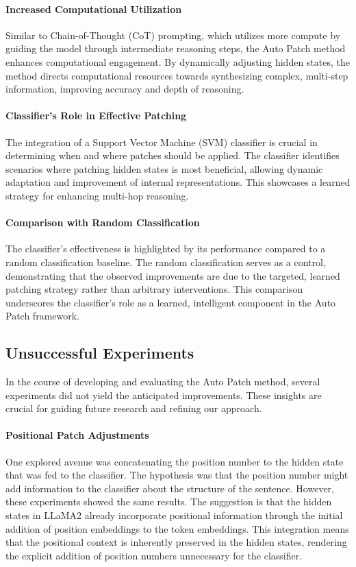 \documentclass[11pt]{article}
\begin{document}
\paragraph{Increased Computational Utilization} Similar to Chain-of-Thought (CoT) prompting, which utilizes more compute by guiding the model through intermediate reasoning steps, the Auto Patch method enhances computational engagement. By dynamically adjusting hidden states, the method directs computational resources towards synthesizing complex, multi-step information, improving accuracy and depth of reasoning.

\paragraph{Classifier's Role in Effective Patching} The integration of a Support Vector Machine (SVM) classifier is crucial in determining when and where patches should be applied. The classifier identifies scenarios where patching hidden states is most beneficial, allowing dynamic adaptation and improvement of internal representations. This showcases a learned strategy for enhancing multi-hop reasoning.

\paragraph{Comparison with Random Classification} The classifier’s effectiveness is highlighted by its performance compared to a random classification baseline. The random classification serves as a control, demonstrating that the observed improvements are due to the targeted, learned patching strategy rather than arbitrary interventions. This comparison underscores the classifier's role as a learned, intelligent component in the Auto Patch framework.



\subsection{Unsuccessful Experiments}
In the course of developing and evaluating the Auto Patch method, several experiments did not yield the anticipated improvements. These insights are crucial for guiding future research and refining our approach.

\paragraph{Positional Patch Adjustments} One explored avenue was concatenating the position number to the hidden state that was fed to the classifier. The hypothesis was that the position number might add information to the classifier about the structure of the sentence. However, these experiments showed the same results. The suggestion is that the hidden states in LLaMA2 already incorporate positional information through the initial addition of position embeddings to the token embeddings. This integration means that the positional context is inherently preserved in the hidden states, rendering the explicit addition of position numbers unnecessary for the classifier.
\end{document}
